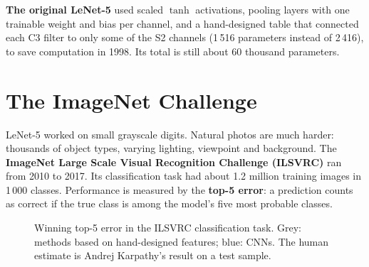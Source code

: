 \documentclass[12pt, a4paper]{article}
\begin{document}
\begin{notebox}
  \textbf{The original LeNet-5} used scaled $\tanh$ activations, pooling
  layers with one trainable weight and bias per channel, and a hand-designed
  table that connected each C3 filter to only some of the S2 channels
  (1\,516 parameters instead of 2\,416), to save computation in 1998.
  Its total is still about 60 thousand parameters.
\end{notebox}

\section{The ImageNet Challenge}

LeNet-5 worked on small grayscale digits. Natural photos are much harder:
thousands of object types, varying lighting, viewpoint and background.
The \textbf{ImageNet Large Scale Visual Recognition Challenge (ILSVRC)} ran
from 2010 to 2017. Its classification task had about 1.2 million training
images in 1\,000 classes. Performance is measured by the \textbf{top-5 error}:
a prediction counts as correct if the true class is among the model's five
most probable classes.

\begin{figure}[H]
  \centering
  \caption{Winning top-5 error in the ILSVRC classification task. Grey: methods
    based on hand-designed features; blue: CNNs. The human estimate is
    Andrej Karpathy's result on a test sample.}
  \label{fig:ilsvrc}
\end{figure}
\end{document}
